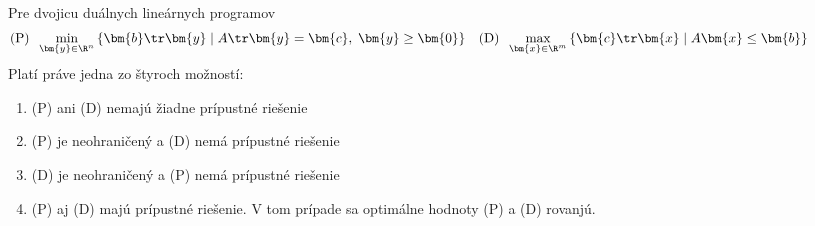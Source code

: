\begin{framed}
  \begin{veta}
    \label{thm:strongduality}
    Pre dvojicu duálnych lineárnych programov
    \begin{align*}
      \text{(P)}\;\; \min_{\bm{y}\in\R^n}\left\{ \bm{b}\tr\bm{y} \mid A\tr\bm{y}=\bm{c},\;\bm{y}\ge\bm{0}\right\}
      &&
      \text{(D)}\;\;\max_{\bm{x}\in\R^m}\left\{ \bm{c}\tr\bm{x} \mid A\bm{x}\le\bm{b}\right\}\hspace*{10ex}
    \end{align*}
    Platí práve jedna zo štyroch možností:
    \begin{enumerate}
      \item (P) ani (D) nemajú žiadne prípustné riešenie
      \item (P) je neohraničený a (D) nemá prípustné riešenie
      \item (D) je neohraničený a (P) nemá prípustné riešenie
      \item (P) aj (D) majú prípustné riešenie. V tom prípade sa optimálne hodnoty (P) a (D) rovanjú.
    \end{enumerate}
  \end{veta}
\end{framed}

